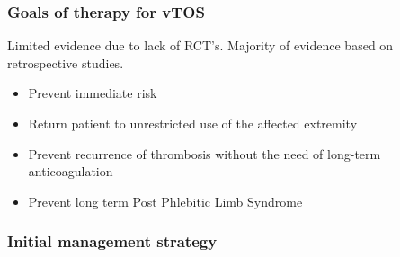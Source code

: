 \documentclass[
]{book}
\begin{document}
\hypertarget{goals-of-therapy-for-vtos}{%
\subsubsection{Goals of therapy for vTOS}\label{goals-of-therapy-for-vtos}}

Limited evidence due to lack of RCT's. Majority of evidence based on
retrospective studies.~

\begin{itemize}
\item
  Prevent immediate risk~
\item
  Return patient to unrestricted use of the affected extremity
\item
  Prevent recurrence of thrombosis without the need of long-term
  anticoagulation
\item
  Prevent long term Post Phlebitic Limb Syndrome
\end{itemize}

\hypertarget{initial-management-strategy}{%
\subsubsection{Initial management strategy}\label{initial-management-strategy}}
\end{document}
